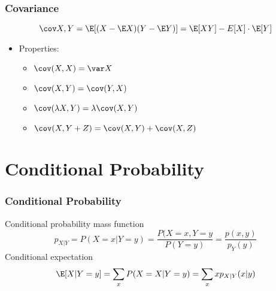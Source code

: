 \documentclass[mathserif, xcolor=table, svgnames]{beamer}
\begin{document}
\begin{frame}
  \frametitle{Covariance}
  \begin{equation*}
    \cov X,Y = \E [(X - \E X)(Y - \E Y) ]
    = \E [X Y] - E[X] \cdot \E[Y]
  \end{equation*}
  \begin{itemize}
  \item Properties:
    \begin{itemize}
    \item $\cov(X,X) = \var X$
    \item $\cov(X,Y) = \cov(Y, X)$
    \item $\cov(\lambda X, Y) = \lambda \cov(X, Y)$
    \item $\cov(X, Y + Z) = \cov(X, Y) + \cov(X, Z)$
    \end{itemize}
  \end{itemize}
\end{frame}

\section{Conditional Probability}

\begin{frame}
  \frametitle{Conditional Probability}
  Conditional probability mass function
  \begin{equation*}
    p_{X|Y} = P(X = x|Y = y)
    =
    \frac{P(X = x, Y=y}{P(Y = y)}
    =
    \frac{p(x,y)}{p_{Y}(y)}
  \end{equation*}
  Conditional expectation
  \begin{equation*}
    \E[X|Y = y] =
    \sum_{x} P(X = X|Y = y)
    =
    \sum_{x} x p_{X|Y} (x|y)
  \end{equation*}
\end{frame}
\end{document}
